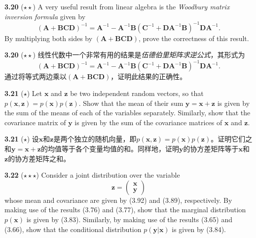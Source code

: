 \documentclass{article}
\begin{document}
\textbf{3.20} ($\star\star$) A very useful result from linear algebra is the \emph{Woodbury matrix inversion formula} given by
\begin{equation}
(\mathbf{A} + \mathbf{BCD})^{-1} = \mathbf{A}^{-1} - \mathbf{A}^{-1}\mathbf{B}(\mathbf{C}^{-1} + \mathbf{DA}^{-1}\mathbf{B})^{-1}\mathbf{DA}^{-1}. \tag{3.210}
\end{equation}
By multiplying both sides by $(\mathbf{A} + \mathbf{BCD})$, prove the correctness of this result.

\textbf{3.20} ($\star\star$) 线性代数中一个非常有用的结果是\emph{伍德伯里矩阵求逆公式}，其形式为
\begin{equation}
(\mathbf{A} + \mathbf{BCD})^{-1} = \mathbf{A}^{-1} - \mathbf{A}^{-1}\mathbf{B}(\mathbf{C}^{-1} + \mathbf{DA}^{-1}\mathbf{B})^{-1}\mathbf{DA}^{-1}. \tag{3.210}
\end{equation}
通过将等式两边乘以$(\mathbf{A} + \mathbf{BCD})$，证明此结果的正确性。

\textbf{3.21} ($\star$) Let $\mathbf{x}$ and $\mathbf{z}$ be two independent random vectors, so that $p(\mathbf{x}, \mathbf{z}) = p(\mathbf{x})p(\mathbf{z})$. Show that the mean of their sum $\mathbf{y} = \mathbf{x} + \mathbf{z}$ is given by the sum of the means of each of the variables separately. Similarly, show that the covariance matrix of $\mathbf{y}$ is given by the sum of the covariance matrices of $\mathbf{x}$ and $\mathbf{z}$.

\textbf{3.21} ($\star$) 设$\mathbf{x}$和$\mathbf{z}$是两个独立的随机向量，即$p(\mathbf{x}, \mathbf{z}) = p(\mathbf{x})p(\mathbf{z})$。证明它们之和$\mathbf{y} = \mathbf{x} + \mathbf{z}$的均值等于各个变量均值的和。同样地，证明$\mathbf{y}$的协方差矩阵等于$\mathbf{x}$和$\mathbf{z}$的协方差矩阵之和。

\textbf{3.22} ($\star\star\star$) Consider a joint distribution over the variable
\begin{equation}
\mathbf{z} = \begin{pmatrix} \mathbf{x} \\ \mathbf{y} \end{pmatrix} \tag{3.211}
\end{equation}
whose mean and covariance are given by (3.92) and (3.89), respectively. By making use of the results (3.76) and (3.77), show that the marginal distribution $p(\mathbf{x})$ is given by (3.83). Similarly, by making use of the results (3.65) and (3.66), show that the conditional distribution $p(\mathbf{y}|\mathbf{x})$ is given by (3.84).
\end{document}
